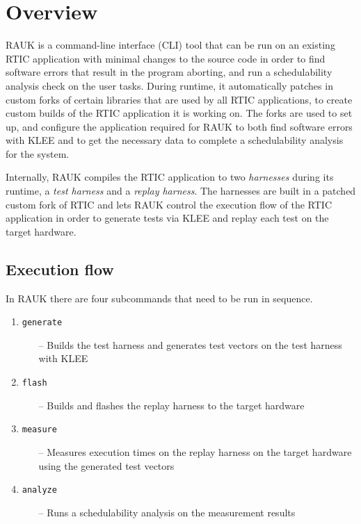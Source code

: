 \section{Overview}
RAUK is a command-line interface (CLI) tool that can be run on an existing
RTIC application with minimal changes to the source code in order to find software
errors that result in the program aborting, and run a
schedulability analysis check on the user tasks. During runtime, it automatically
patches in custom forks of certain libraries that are used by all RTIC
applications, to create custom builds of the RTIC application it is working on.
The forks are used to set up, and configure the application required for RAUK to both
find software errors with KLEE and to get the necessary data to complete a
schedulability analysis for the system.

Internally, RAUK compiles the RTIC application to two \emph{harnesses} during
its runtime, a \emph{test harness} and a \emph{replay harness}. The harnesses
are built in a patched custom fork of RTIC and lets RAUK control the execution
flow of the RTIC application in order to generate tests via KLEE and replay
each test on the target hardware.

\subsection{Execution flow}
In RAUK there are four subcommands that need to be run in sequence.

\begin{enumerate}
    \item \texttt{generate}
    \begin{itemize}
        \item [--] Builds the test harness and generates test vectors on the test
            harness with KLEE
    \end{itemize}
    \item \texttt{flash}
    \begin{itemize}
        \item [--] Builds and flashes the replay harness to the target hardware
    \end{itemize}
    \item \texttt{measure}
    \begin{itemize}
        \item [--] Measures execution times on the replay harness on the target
            hardware using the generated test vectors
    \end{itemize}
    \item \texttt{analyze}
    \begin{itemize}
        \item [--] Runs a schedulability analysis on the measurement results
    \end{itemize}
\end{enumerate}

